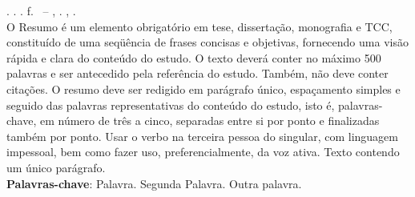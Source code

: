 
\begin{resumo}[RESUMO]
\begin{SingleSpacing}

\imprimirautorcitacao. \imprimirtitulo. \imprimirdata. \pageref {LastPage} f. \imprimirprojeto\ – \imprimirprograma, \imprimirinstituicao. \imprimirlocal, \imprimirdata.\\

O Resumo é um elemento obrigatório em tese, dissertação, monografia e TCC, constituído de uma seqüência de frases concisas e objetivas, fornecendo uma visão rápida e clara do conteúdo do estudo. O texto deverá conter no máximo 500 palavras e ser antecedido
pela referência do estudo. Também, não deve conter citações. O resumo deve ser redigido em parágrafo único, espaçamento simples e seguido das palavras representativas do conteúdo do estudo, isto é, palavras-chave, em número de três a cinco, separadas entre si por ponto e finalizadas também por ponto. Usar o verbo na terceira pessoa do singular, com linguagem impessoal, bem como fazer uso, preferencialmente, da voz ativa. Texto contendo um único parágrafo.\\

\textbf{Palavras-chave}: Palavra. Segunda Palavra. Outra palavra.

\end{SingleSpacing}
\end{resumo}

%

